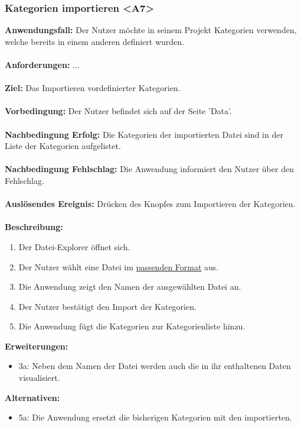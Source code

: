 \documentclass[parskip=full]{scrartcl} %
\begin{document}
\subsubsection*{Kategorien importieren <A7>}
\textbf{Anwendungsfall:} Der Nutzer möchte in seinem Projekt Kategorien verwenden, welche bereits in einem anderen definiert wurden.\\\\
\textbf{Anforderungen:} ...\\\\
\textbf{Ziel:} Das Importieren vordefinierter Kategorien. \\\\
\textbf{Vorbedingung:} Der Nutzer befindet sich auf der Seite 'Data'. \\\\
\textbf{Nachbedingung Erfolg:} Die Kategorien der importierten Datei sind in der Liste der Kategorien aufgelistet. \\\\
\textbf{Nachbedingung Fehlschlag:} Die Anwendung informiert den Nutzer über den Fehlschlag. \\\\
\textbf{Auslösendes Ereignis:} Drücken des Knopfes zum Importieren der Kategorien.\\\\
\textbf{Beschreibung:}
\begin{enumerate}
    \item Der Datei-Explorer öffnet sich.
    \item Der Nutzer wählt eine Datei im \hyperlink{dataformat}{passenden Format} aus.
    \item Die Anwendung zeigt den Namen der ausgewählten Datei an.
    \item Der Nutzer bestätigt den Import der Kategorien.
    \item Die Anwendung fügt die Kategorien zur Kategorienliste hinzu.
\end{enumerate}
\textbf{Erweiterungen:} 
\begin{itemize}
    \item 3a: Neben dem Namen der Datei werden auch die in ihr enthaltenen Daten visualisiert.
\end{itemize}
\textbf{Alternativen:} 
\begin{itemize}
    \item 5a: Die Anwendung ersetzt die bisherigen Kategorien mit den importierten.
\end{itemize}
\newpage
\end{document}
